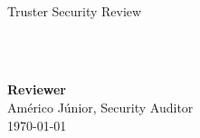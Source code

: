 \begin{titlepage}
  \vbox{}
  \vbox{}

  \begin{center}


    \noindent\makebox[\linewidth]{\rule{.7\paperwidth}{.6pt}}\\[0.7cm]

    { \huge \bfseries

      Truster Security Review
    }\\[0.25cm]
    
    \noindent\makebox[\linewidth]{\rule{.7\paperwidth}{.6pt}}\\[0.7cm]

    
    \vfill


    
    \large
    {\bfseries Reviewer}\\
    
    Américo Júnior, Security Auditor \\

    {\large \today}

  \end{center}

\end{titlepage}